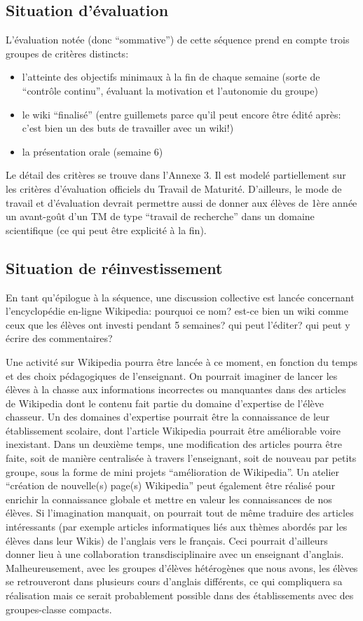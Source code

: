\documentclass[11pt,bibliography=totoc]{scrartcl}
\newcommand\ajout[1]{{\color{blue} #1}}
\begin{document}
\subsection{Situation d'évaluation}
L'évaluation notée (donc ``sommative'') de cette séquence prend en compte trois
groupes de critères distincts:
\begin{itemize}
\item l'atteinte des objectifs minimaux à la fin de chaque semaine (sorte de
  ``contrôle continu'', évaluant la motivation et l'autonomie du groupe)
\item le wiki ``finalisé'' (entre guillemets parce qu'il peut encore être édité
  après: c'est bien un des buts de travailler avec un wiki!)
\item la présentation orale (semaine 6)
\end{itemize}
Le détail des critères se trouve dans l'Annexe 3. Il est modelé partiellement
sur les critères d'évaluation officiels du Travail de Maturité. D'ailleurs, le
mode de travail et d'évaluation devrait permettre aussi de donner aux élèves de
1ère année un avant-goût d'un TM de type ``travail de recherche'' dans un domaine
scientifique (ce qui peut être explicité à la fin).

\subsection{Situation de réinvestissement}
En tant qu'épilogue à la séquence, une discussion collective est lancée
concernant l'encyclopédie en-ligne Wikipedia: pourquoi ce nom? est-ce bien un
wiki comme ceux que les élèves ont investi pendant 5 semaines? qui peut
l'éditer? qui peut y écrire des commentaires?

Une activité sur Wikipedia pourra être lancée à ce moment, en fonction du temps
et des choix pédagogiques de l'enseignant.  On pourrait imaginer de lancer les
élèves à la chasse aux informations incorrectes ou manquantes dans des articles
de Wikipedia dont le contenu fait partie du domaine d'expertise de l'élève
chasseur. Un des domaines d'expertise pourrait être la connaissance de leur
établissement scolaire, dont l'article Wikipedia pourrait être améliorable voire
inexistant.  Dans un deuxième temps, une modification des articles pourra être
faite, soit de manière centralisée à travers l'enseignant, soit de nouveau par
petits groupe, sous la forme de mini projets ``amélioration de Wikipedia''.
\ajout {
Un atelier ``création de nouvelle(s) page(s) Wikipedia'' peut également être réalisé pour enrichir la connaissance globale et mettre en valeur les connaissances de nos élèves. Si l'imagination manquait, on pourrait tout de même traduire des articles intéressants (par exemple articles informatiques liés aux thèmes abordés par les élèves dans leur Wikis) de l'anglais vers le français. Ceci pourrait d'ailleurs donner lieu à une collaboration transdisciplinaire avec un enseignant d'anglais. Malheureusement, avec les groupes d'élèves hétérogènes que nous avons, les élèves se retrouveront dans plusieurs cours d'anglais différents, ce qui compliquera sa réalisation mais ce serait probablement possible dans des établissements avec des groupes-classe compacts.
}
\end{document}
